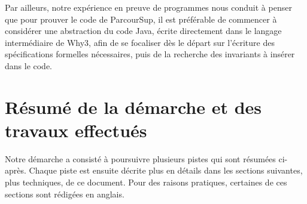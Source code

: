 \documentclass[a4paper]{report}
\begin{document}
Par ailleurs, notre expérience en preuve de programmes nous conduit à
penser que pour prouver le code de ParcourSup, il est préférable de
commencer à considérer une abstraction du code Java, écrite
directement dans le langage intermédiaire de Why3, afin de se
focaliser dès le départ sur l'écriture des spécifications formelles
nécessaires, puis de la recherche des invariants à insérer dans le
code.

\section{Résumé de la démarche et des travaux effectués}

Notre démarche a consisté à poursuivre plusieurs pistes qui sont résumées
ci-après. Chaque piste est ensuite décrite plus en détails dans les sections
suivantes, plus techniques, de ce document. Pour des raisons pratiques,
certaines de ces sections sont rédigées en anglais.
\end{document}
